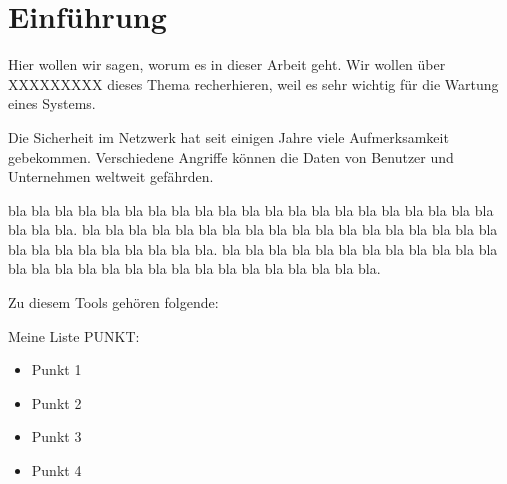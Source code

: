 \section{Einführung}

Hier wollen wir sagen, worum es in dieser Arbeit geht. Wir wollen über  XXXXXXXXX dieses Thema recherhieren,
weil es sehr wichtig für die Wartung eines Systems.


Die Sicherheit im Netzwerk hat seit einigen Jahre viele Aufmerksamkeit gebekommen. Verschiedene Angriffe können
die Daten von Benutzer und Unternehmen weltweit gefährden.


bla bla bla bla bla bla bla bla bla bla bla bla bla bla bla bla bla bla bla bla bla bla bla bla.
bla bla bla bla bla bla bla bla bla bla bla bla bla bla bla bla bla bla bla bla bla bla bla bla bla bla bla.
bla bla bla bla bla bla bla bla bla bla bla bla bla bla bla bla bla bla bla bla bla bla bla bla bla bla bla bla.

Zu diesem Tools gehören folgende:

Meine Liste PUNKT:
\begin{itemize}
    \item Punkt 1
    \item Punkt 2
    \item Punkt 3
    \item Punkt 4
\end{itemize}

